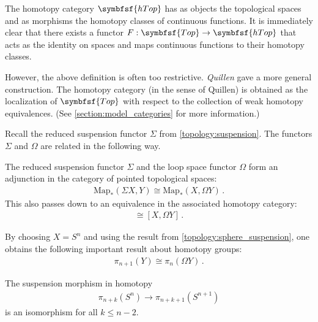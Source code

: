     \begin{property}
        The homotopy category $\symbfsf{hTop}$ has as objects the topological spaces and as morphisms the homotopy classes of continuous functions. It is immediately clear that there exists a functor $F:\symbfsf{Top}\rightarrow\symbfsf{hTop}$ that acts as the identity on spaces and maps continuous functions to their homotopy classes.

        However, the above definition is often too restrictive. \textit{Quillen} gave a more general construction. The homotopy category (in the sense of Quillen) is obtained as the localization of $\symbfsf{Top}$ with respect to the collection of weak homotopy equivalences. (See \cref{section:model_categories} for more information.)
    \end{property}

    Recall the reduced suspension functor $\Sigma$ from \cref{topology:suspension}. The functors $\Sigma$ and $\Omega$ are related in the following way.
    \begin{property}\label{topology:eckmann_hilton}
        The reduced suspension functor $\Sigma$ and the loop space functor $\Omega$ form an adjunction in the category of pointed topological spaces:
        \begin{gather}
            \mathrm{Map}_*(\Sigma X,Y)\cong\mathrm{Map}_*(X,\Omega Y)\,.
        \end{gather}
        This also passes down to an equivalence in the associated homotopy category:
        \begin{gather}
            [\Sigma X,Y]\cong[X,\Omega Y]\,.
        \end{gather}
    \end{property}
    \begin{result}\label{topology:desuspension}
        By choosing $X=S^n$ and using the result from \cref{topology:sphere_suspension}, one obtains the following important result about homotopy groups:
        \begin{gather}
            \pi_{n+1}(Y)\cong\pi_n(\Omega Y)\,.
        \end{gather}
    \end{result}

    \begin{theorem}\label{topology:freudenthal}
        The suspension morphism in homotopy
        \begin{gather}
            \pi_{n+k}(S^n)\rightarrow\pi_{n+k+1}(S^{n+1})
        \end{gather}
        is an isomorphism for all $k\leq n-2$.
    \end{theorem}

